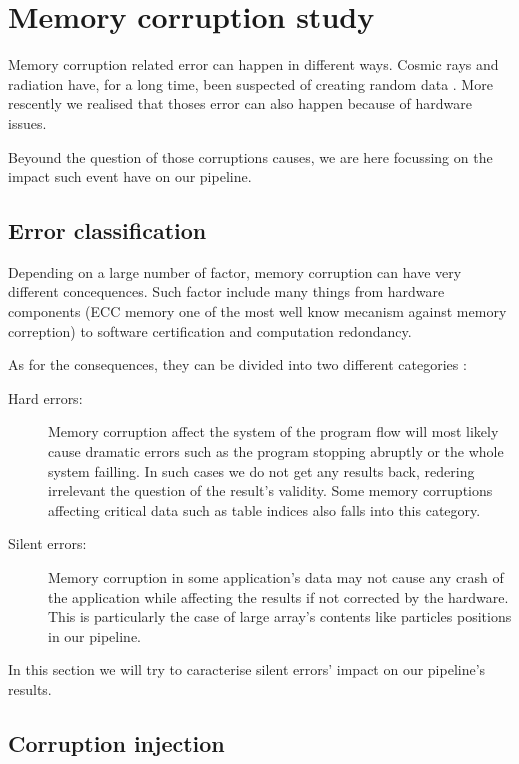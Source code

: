 \documentclass[10pt,a4paper,twoside,twocolumn]{article}
\begin{document}
\section{Memory corruption study}

Memory corruption related error can happen in different ways. Cosmic rays and
radiation have, for a long time, been suspected of creating random data
. More rescently we realised that thoses error can also happen because
of hardware issues.

Beyound the question of those corruptions causes, we are here focussing on the
impact such event have on our pipeline.

\subsection{Error classification}

Depending on a large number of factor, memory corruption can have very different
concequences. Such factor include many things from hardware components (ECC
memory one of the most well know mecanism against memory correption) to software
certification and computation redondancy.

As for the consequences, they can be divided into two different categories :
\begin{description}
	\item[Hard errors:] Memory corruption affect the system of the program flow
		will most likely cause dramatic errors such as the program stopping
		abruptly or the whole system failling. In such cases we do not get any
		results back, redering irrelevant the question of the result's validity.
		Some memory corruptions affecting critical data such as table indices also
		falls into this category.

	\item[Silent errors:] Memory corruption in some application's data may not
		cause any crash of the application while affecting the results if not
		corrected by the hardware. This is particularly the case of large array's
		contents like particles positions in our pipeline.
\end{description}

In this section we will try to caracterise silent errors' impact on our
pipeline's results.

\subsection{Corruption injection}
\end{document}

